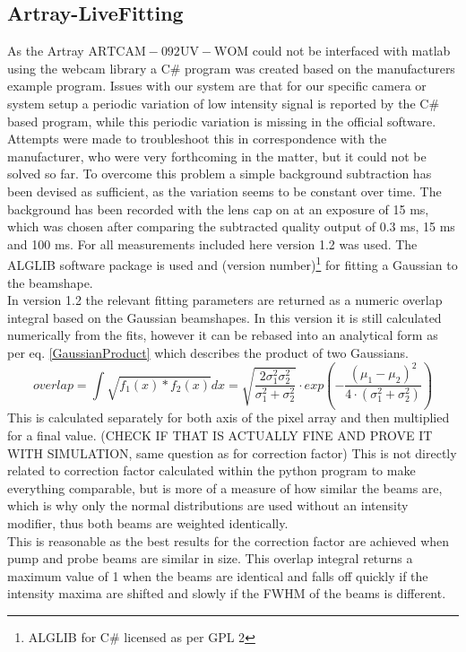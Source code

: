 \documentclass[twoside,openright]{scrreprt}
\begin{document}
\subsection{Artray-LiveFitting}\label{Sec:LiveFitting}
As the Artray $\mathrm{ARTCAM-092UV-WOM}$ could not be interfaced with matlab using the webcam library a C\# program was created based on the manufacturers example program.
Issues with our system are that for our specific camera or system setup a periodic variation of low intensity signal is reported by the C\# based program, while this periodic variation is missing in the official software. Attempts were made to troubleshoot this in correspondence with the manufacturer, who were very forthcoming in the matter, but it could not be solved so far. To overcome this problem a simple background subtraction has been devised as sufficient, as the variation seems to be constant over time. The background has been recorded with the lens cap on at an exposure of 15 ms, which was chosen after comparing the subtracted quality output of 0.3 ms, 15 ms and 100 ms. 
\newline
For all measurements included here version 1.2 was used. The  ALGLIB software package is used and (version number)\footnote{ALGLIB for C\# licensed as per GPL 2} for fitting a Gaussian to the beamshape.\\
In version 1.2 the relevant fitting parameters are returned as a numeric overlap integral based on the Gaussian beamshapes. In this version it is still calculated numerically from the fits, however it can be rebased into an analytical form as per eq. \ref{GaussianProduct} which describes the product of two Gaussians.
\begin{equation}
overlap = \int \sqrt{f_1(x)*f_2(x)}dx =  \sqrt{\frac{2 \sigma_1^2\sigma_2^2}{\sigma_1^2+\sigma_2^2}}\cdot exp\left(-\frac{\left(\mu_1-\mu_2\right)^2}{4\cdot \left(\sigma_1^2 + \sigma_2^2\right)}\right)
\end{equation}
This is calculated separately for both axis of the pixel array and then multiplied for a final value. (CHECK IF THAT IS ACTUALLY FINE AND PROVE IT WITH SIMULATION, same question as for correction factor)
This is not directly related to correction factor calculated within the python program to make everything comparable, but is more of a measure of how similar the beams are, which is why only the normal distributions are used without an intensity modifier, thus both beams are weighted identically. \\
This is reasonable as the best results for the correction factor are achieved when pump and probe beams are similar in size. This overlap integral returns a maximum value of 1 when the beams are identical and falls off quickly if the intensity maxima are shifted and slowly if the FWHM of the beams is different.\\
\end{document}
